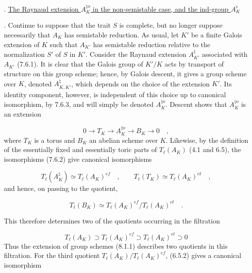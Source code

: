 
\medskip
{}. \underline{The Raynaud extension $A_K^{\natural o}$ in the
non-semistable case, and the ind-group $A_K^{\flat}$}

\medskip
{}. Continue to suppose that the trait $S$ is complete, but no
longer suppose necessarily that $A_K$ has semistable reduction. As
usual, let $K'$ be a finite Galois extension of $K$ such that
$A_{K'}$ has semistable reduction relative to the normalization $S'$
of $S$ in $K'$. Consider the Raynaud extension
$A_{K'}^{\natural}$ associated with $A_{K'}$ (7.6.1). It is clear
that the Galois group of $K'/K$ acts by transport of structure on
this group scheme; hence, by Galois descent, it gives a group scheme
over $K$, denoted $A_{K,K'}^{\natural}$, which depends on the choice
of the extension $K'$. Its identity component, however, is
independent of this choice up to canonical isomorphism, by 7.6.3,
and will simply be denoted $A_K^{\natural o}$. Descent shows that
$A_K^{\natural o}$ is an extension

\begin{equation}\tag{8.1.1}
0 \longrightarrow T_K \longrightarrow A_K^{\natural o}
 \longrightarrow B_K \longrightarrow 0 \quad ,
\end{equation}
where $T_K$ is a torus and $B_K$ an abelian scheme over $K$.
Likewise, by the definition of the essentially fixed and essentially
toric parts of $T_{\ell}(A_K)$ (4.1 and 6.5), the isomorphisms
(7.6.2) give canonical isomorphisms

\begin{equation}\tag{8.1.2}
T_{\ell}(A_K^{\natural}) \simeq T_{\ell}(A_K)^{ef} \quad ,
\qquad T_{\ell}(T_K) \simeq T_{\ell}(A_K)^{et} \quad ,
\end{equation}
and hence, on passing to the quotient,

\begin{equation}\tag{8.1.3}
T_{\ell}(B_K) \simeq
T_{\ell}(A_K)^{ef}/T_{\ell}(A_K)^{et} \quad .
\end{equation}

This therefore determines two of the quotients occurring in the
filtration

\begin{equation}\tag{8.1.4}
T_\ell(A_K) \supset T_\ell(A_K)^{ef}
 \supset T_\ell(A_K)^{et} \supset 0
\end{equation}
Thus the extension of group schemes (8.1.1) describes two quotients
in this filtration. For the third quotient
$T_\ell(A_K)/T_\ell(A_K)^{ef}$, (6.5.2) gives a canonical
isomorphism

